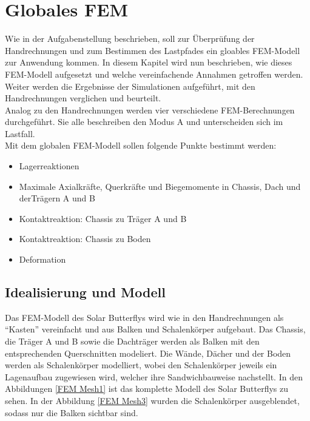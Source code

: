\section{Globales FEM}
Wie in der Aufgabenstellung beschrieben, soll zur Überprüfung der Handrechnungen und zum Bestimmen des Lastpfades ein gloables FEM-Modell zur Anwendung kommen. In diesem Kapitel wird nun beschrieben, wie dieses FEM-Modell aufgesetzt und welche vereinfachende Annahmen getroffen werden. Weiter werden die Ergebnisse der Simulationen aufgeführt, mit den Handrechnungen verglichen und beurteilt.\\
Analog zu den Handrechnungen werden vier verschiedene FEM-Berechnungen durchgeführt. Sie alle beschreiben den Modus A und unterscheiden sich im Lastfall.\\

Mit dem globalen FEM-Modell sollen folgende Punkte bestimmt werden:
\begin{itemize}
  \item Lagerreaktionen
  \item Maximale Axialkräfte, Querkräfte und Biegemomente in Chassis, Dach und derTrägern A und B
  \item Kontaktreaktion: Chassis zu Träger A und B
  \item Kontaktreaktion: Chassis zu Boden
  \item Deformation
\end{itemize}

\subsection{Idealisierung und Modell}
Das FEM-Modell des Solar Butterflys wird wie in den Handrechnungen als ``Kasten'' vereinfacht und aus Balken und Schalenkörper aufgebaut. Das Chassis, die Träger A und B sowie die Dachträger werden als Balken mit den entsprechenden Querschnitten modeliert. Die Wände, Dächer und der Boden werden als Schalenkörper modelliert, wobei den Schalenkörper jeweils ein Lagenaufbau zugewiesen wird, welcher ihre Sandwichbauweise nachstellt. In den Abbildungen \ref{FEM Mesh1} ist das komplette Modell des Solar Butterflys zu sehen. In der Abbildung \ref{FEM Mesh3} wurden die Schalenkörper ausgeblendet, sodass nur die Balken sichtbar sind.

